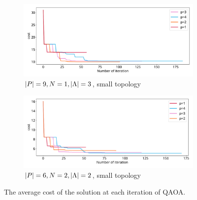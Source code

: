 \begin{figure}[H]
\centering
\begin{subfigure}{0.49\textwidth}
	\includegraphics[width=\textwidth]{pictures/plots/nit/9-1-3-s.pdf}
	\caption{$\lvert P\rvert=9, N=1, \lvert\Lambda\rvert = 3$, small topology}
\end{subfigure}
\begin{subfigure}{0.49\textwidth}
	\includegraphics[width=\textwidth]{pictures/plots/nit/6-2-2-s.pdf}
	\caption{$ \lvert P\rvert=6, N=2, \lvert\Lambda\rvert = 2$, small topology}
\end{subfigure}
\caption{The average cost of the solution at each iteration of QAOA.}
	\label{fig:nit}
\end{figure}


